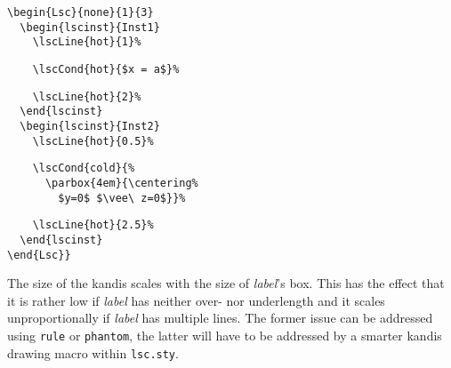 \documentclass{article}
\newcommand{\bs}{\usebox{\bsbox}}
\newcommand{\cmd}[1]{\bs\texttt{#1}}
\newcommand{\sty}[1]{\texttt{#1.sty}}
\newcommand{\lscsty}{\sty{lsc}}
\newcommand{\var}[1]{\textit{#1}}
\begin{document}
\begin{center}%
\begin{minipage}{0.45\textwidth}%
\end{minipage}%
\hfill%
\begin{minipage}{0.47\textwidth}%
\small%
{\gray\begin{verbatim}
\begin{Lsc}{none}{1}{3}
  \begin{lscinst}{Inst1}
    \lscLine{hot}{1}%
\end{verbatim}}%
\verbunskip%
{\begin{verbatim}
    \lscCond{hot}{$x = a$}%
\end{verbatim}}%
\verbunskip%
{\gray\begin{verbatim}
    \lscLine{hot}{2}%
  \end{lscinst}
  \begin{lscinst}{Inst2}
    \lscLine{hot}{0.5}%
\end{verbatim}}%
\verbunskip%
{\begin{verbatim}
    \lscCond{cold}{%
      \parbox{4em}{\centering%
        $y=0$ $\vee\ z=0$}}%
\end{verbatim}}%
\verbunskip%
{\gray\begin{verbatim}
    \lscLine{hot}{2.5}%
  \end{lscinst}
\end{Lsc}}
\end{verbatim}}%
\end{minipage}
\end{center}%

The size of the kandis scales with the size of \var{label}'s box.
%
This has the effect that it is rather low if \var{label} has neither over- nor
underlength and it scales unproportionally if \var{label} has multiple lines. 
%
The former issue can be addressed using \cmd{rule} or \cmd{phantom}, the
latter will have to be addressed by a smarter kandis drawing macro within
\lscsty{}.
\end{document}
